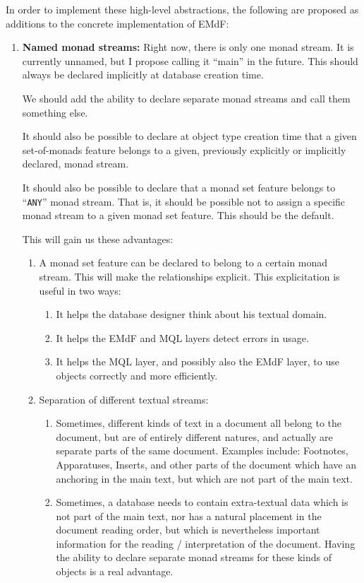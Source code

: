 \documentclass[a4paper,12pt]{article}
\begin{document}
\noindent In order to implement these high-level abstractions, the
following are proposed as additions to the concrete implementation of
EMdF:

\begin{enumerate}
\item \textbf{Named monad streams:} Right now, there is only one monad
  stream.  It is currently unnamed, but I propose calling it ``main''
  in the future.  This should always be declared implicitly at
  database creation time.

  We should add the ability to declare separate monad streams and call
  them something else.

  It should also be possible to declare at object type creation time
  that a given set-of-monads feature belongs to a given, previously
  explicitly or implicitly declared, monad stream.

  It should also be possible to declare that a monad set feature
  belongs to ``\texttt{ANY}'' monad stream.  That is, it should be
  possible not to assign a specific monad stream to a given monad set
  feature.  This should be the default.

  This will gain us these advantages:
  \begin{enumerate}
  \item A monad set feature can be declared to belong to a certain
    monad stream.  This will make the relationships explicit.  This
    explicitation is useful in two ways:
    \begin{enumerate}
      \item It helps the database designer think about his textual
        domain.
      \item It helps the EMdF and MQL layers detect errors in usage.
      \item It helps the MQL layer, and possibly also the EMdF layer,
        to use objects correctly and more efficiently.
    \end{enumerate}

  \item Separation of different textual streams:

    \begin{enumerate}
    \item Sometimes, different kinds of text in a document all belong
      to the document, but are of entirely different natures, and
      actually are separate parts of the same document.  Examples
      include: Footnotes, Apparatuses, Inserts, and other parts of the
      document which have an anchoring in the main text, but which are
      not part of the main text.
    \item Sometimes, a database needs to contain extra-textual data
      which is not part of the main text, nor has a natural placement
      in the document reading order, but which is nevertheless
      important information for the reading / interpretation of the
      document.  Having the ability to declare separate monad streams
      for these kinds of objects is a real advantage.
    \end{enumerate}
  \end{enumerate}


\end{enumerate}
\end{document}
